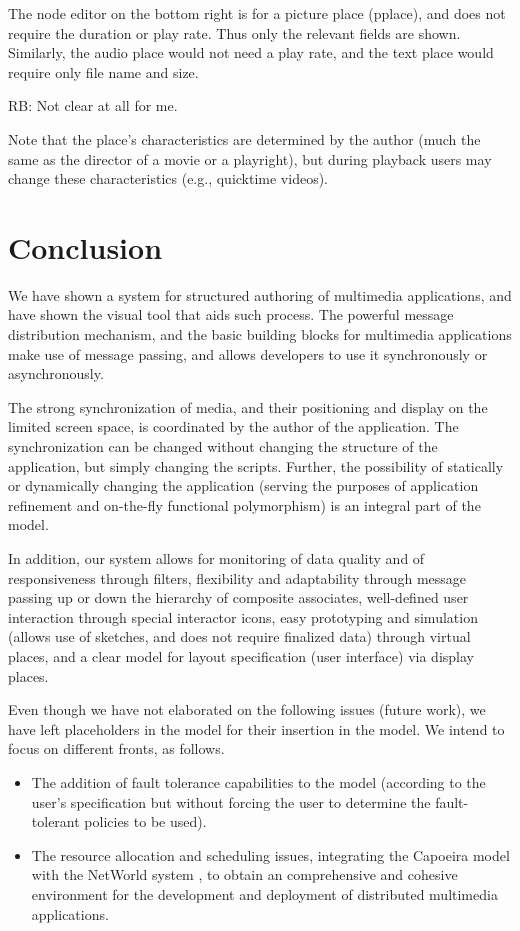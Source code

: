 \documentclass[twocolumn,10pt]{article}
\newenvironment{note}{\comment}{\endcomment}
\begin{document}
The node editor on the bottom right is for a picture place (pplace),
and does not require the duration or play rate.  Thus only the
relevant fields are shown.  Similarly, the audio place would not need
a play rate, and the text place would require only file name and size.

\begin{note}
RB:  Not clear at all for me.

Note that the place's characteristics are determined by the author
(much the same as the director of a movie or a playright), but during
playback users may change these characteristics (e.g., quicktime
videos).
\end{note}

\section{Conclusion}
\label{sect-conc}

We have shown a system for structured authoring of multimedia
applications, and have shown the visual tool that aids such process.
The powerful message distribution mechanism, and the basic building
blocks for multimedia applications make use of message passing, and
allows developers to use it synchronously or asynchronously.

The strong synchronization of media, and their positioning and display
on the limited screen space, is coordinated by the author of the
application.  The synchronization can be changed without changing the
structure of the application, but simply changing the scripts.
Further, the possibility of statically or dynamically changing the
application (serving the purposes of application refinement and
on-the-fly functional polymorphism) is an integral part of the model.

In addition, our system allows for monitoring of data quality and of
responsiveness through filters, flexibility and adaptability through
message passing up or down the hierarchy of composite associates,
well-defined user interaction through special interactor icons, easy
prototyping and simulation (allows use of sketches, and does not
require finalized data) through virtual places, and a clear model for
layout specification (user interface) via display places.

Even though we have not elaborated on the following issues (future
work), we have left placeholders in the model for their insertion in
the model.  We intend to focus on different fronts, as follows.
\begin{itemize}
  \item The addition of fault tolerance capabilities to the model
        (according to the user's specification but without forcing the
        user to determine the fault-tolerant policies to be used).
  \item The resource allocation and scheduling issues, integrating the
        Capoeira model with the NetWorld system
        \cite{mos:mmtrafic}, to obtain an
        comprehensive and cohesive environment for the development and
        deployment of distributed multimedia applications.
\end{itemize}
  
\end{document}
